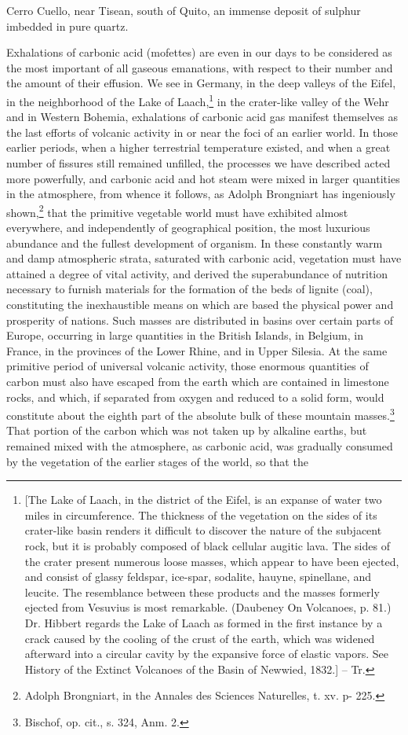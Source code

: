 Cerro Cuello, near Tisean, south of Quito, an immense deposit of sulphur imbedded in pure quartz.

Exhalations of carbonic acid (mofettes) are even in our days
to be considered as the most important of all gaseous emanations, with respect to their number and the amount of their effusion. We see in Germany, in the deep valleys of the Eifel, in the neighborhood of the Lake of Laach,\footnote{[The Lake of Laach, in the district of the Eifel, is an expanse of water two miles in circumference. The thickness of the vegetation on the sides of its crater-like basin renders it difficult to discover the nature of the subjacent rock, but it is probably composed of black cellular augitic lava. The sides of the crater present numerous loose masses, which appear to have been ejected, and consist of glassy feldspar, ice-spar, sodalite, hauyne, spinellane, and leucite. The resemblance between these products and the masses formerly ejected from Vesuvius is most remarkable. (Daubeney On Volcanoes, p. 81.) Dr. Hibbert regards the Lake of Laach as formed in the first instance by a crack caused by the cooling of the crust of the earth, which was widened afterward into a circular cavity by the expansive force of elastic vapors. See History of the Extinct Volcanoes of the Basin of Newwied, 1832.] -- Tr.} in the crater-like valley of the Wehr and in Western Bohemia, exhalations of carbonic acid gas manifest themselves as the last efforts of volcanic activity in or near the foci of an earlier world. In those earlier periods, when a higher terrestrial temperature existed, and when a great number of fissures still remained unfilled, the processes we have described acted more powerfully, and carbonic acid and hot steam were mixed in larger quantities in the atmosphere, from whence it follows, as Adolph Brongniart has ingeniously shown,\footnote{Adolph Brongniart, in the Annales des Sciences Naturelles, t. xv. p- 225.} that the primitive vegetable world must have exhibited almost everywhere, and independently of geographical position, the most luxurious abundance and the fullest development of organism. In these constantly warm and damp atmospheric strata, saturated with carbonic acid, vegetation must have attained a degree of vital activity, and derived the superabundance of nutrition necessary to furnish materials for the formation of the beds of lignite (coal), constituting the inexhaustible means on which are based the physical power and prosperity of nations. Such masses are distributed in basins over certain parts of Europe, occurring in large quantities in the British Islands, in Belgium, in France, in the provinces of the Lower Rhine, and in Upper Silesia. At the same primitive period of universal volcanic activity, those enormous quantities of carbon must also have escaped from the earth which are contained in limestone rocks, and which, if separated from oxygen and reduced to a solid form, would constitute about the eighth part of the absolute bulk of these mountain masses.\footnote{Bischof, op. cit., s. 324, Anm. 2.} That portion of the carbon which was not taken up by alkaline earths, but remained mixed with the atmosphere, as carbonic acid, was gradually consumed by the vegetation of the earlier stages of the world, so that the 